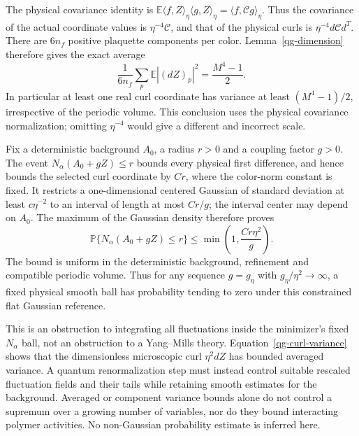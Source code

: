 \documentclass[11pt]{article}
\theoremstyle{remark}
\begin{document}
The physical covariance identity is
$\mathbb E\langle f,Z\rangle_\eta\langle g,Z\rangle_\eta
=\langle f,\mathcal Cg\rangle_\eta$.
Thus the covariance of the actual coordinate values is
$\eta^{-4}\mathcal C$, and that of the physical curls is
$\eta^{-4}d\mathcal C d^T$. There are $6n_f$ positive
plaquette components per color. Lemma~\ref{qg-dimension}
therefore gives the exact average
\begin{equation}\label{qg-curl-variance}
 \boxed{\quad
 \frac1{6n_f}\sum_p\mathbb E|(dZ)_p|^2
     =\frac{M^4-1}{2}.
 \quad}
\end{equation}
In particular at least one real curl coordinate has variance
at least $(M^4-1)/2$, irrespective of the periodic volume.
This conclusion uses the physical covariance normalization;
omitting $\eta^{-4}$ would give a different and incorrect scale.

Fix a deterministic background $A_0$, a radius $r>0$ and
a coupling factor $g>0$. The event
$N_\alpha(A_0+gZ)\le r$ bounds every physical first difference,
and hence bounds the selected curl coordinate by $C r$,
where the color-norm constant is fixed. It restricts a
one-dimensional centered Gaussian of standard deviation
at least $c\eta^{-2}$ to an interval of length at most
$C r/g$; the interval center may depend on $A_0$.
The maximum of the Gaussian density therefore proves
\begin{equation}\label{qg-small-ball}
 \boxed{\quad
 \mathbb P\{N_\alpha(A_0+gZ)\le r\}
       \le \min\left(1,\frac{C r\eta^2}{g}\right).
 \quad}
\end{equation}
The bound is uniform in the deterministic background,
refinement and compatible periodic volume. Thus for any
sequence $g=g_\eta$ with $g_\eta/\eta^2\to\infty$, a fixed
physical smooth ball has probability tending to zero under
this constrained flat Gaussian reference.

This is an obstruction to integrating all fluctuations inside
the minimizer's fixed $N_\alpha$ ball, not an obstruction to
a Yang--Mills theory. Equation~\eqref{qg-curl-variance} shows
that the dimensionless microscopic curl $\eta^2dZ$ has
bounded averaged variance. A quantum renormalization step
must instead control suitable rescaled fluctuation fields
and their tails while retaining smooth estimates for the
background. Averaged or component variance bounds alone
do not control a supremum over a growing number of variables,
nor do they bound interacting polymer activities. No
non-Gaussian probability estimate is inferred here.
\end{document}
